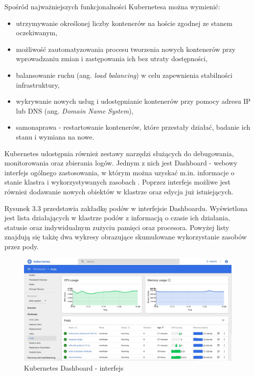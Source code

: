 Spośród najważniejszych funkcjonalności Kubernetesa można wymienić:
\begin{itemize}
    \item utrzymywanie określonej liczby kontenerów na hoście zgodnej ze stanem oczekiwanym,
    \item możliwość zautomatyzowania procesu tworzenia nowych kontenerów przy wprowadzaniu zmian i zastępowania ich bez utraty dostępności,
    \item balansowanie ruchu (ang. \textit{load balancing}) w celu zapewnienia stabilności infrastruktury,
    \item wykrywanie nowych usług i udostępnianie kontenerów przy pomocy adresu IP lub DNS (ang. \textit{Domain Name System}),
    \item samonaprawa - restartowanie kontenerów, które przestały działać, badanie ich stanu i wymiana na nowe.
\end{itemize}

Kubernetes udostępnia również zestawy narzędzi służących do debugowania, monitorowania oraz zbierania logów. Jednym z nich jest Dashboard - webowy interfejs ogólnego zastosowania, w którym można uzyskać m.in. informacje o stanie klastra i wykorzystywanych zasobach \cite{kubernetes}. Poprzez interfejs możliwe jest również dodawanie nowych obiektów w klastrze oraz edycja już istniejących.
\newpage 

Rysunek 3.3 przedstawia zakładkę podów w interfejsie Dashboardu. Wyświetlona jest lista działających w klastrze podów z informacją o czasie ich działania, statusie oraz indywidualnym zużyciu pamięci oraz procesora. Powyżej listy znajdują się takżę dwa wykresy obrazujące skumulowane wykorzystanie zasobów przez pody. 
\vspace{2em}

\begin{figure}[h]
    \centering
    \includegraphics[width=1\textwidth]{img/rozdzial1-52.jpg}
    \caption{Kubernetes Dashboard - interfejs \cite{kubernetes}}
\end{figure}

